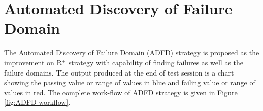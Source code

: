 

\section{Automated Discovery of Failure Domain}\label{sec:adfd}

The Automated Discovery of Failure Domain (ADFD) strategy is proposed as the improvement on R$^+$ strategy with capability of finding failures as well as the failure domains. The output produced at the end of test session is a chart showing the passing value or range of values in blue and failing value or range of values in red. The complete work-flow of ADFD strategy is given in Figure \ref{fig:ADFD-workflow}.

